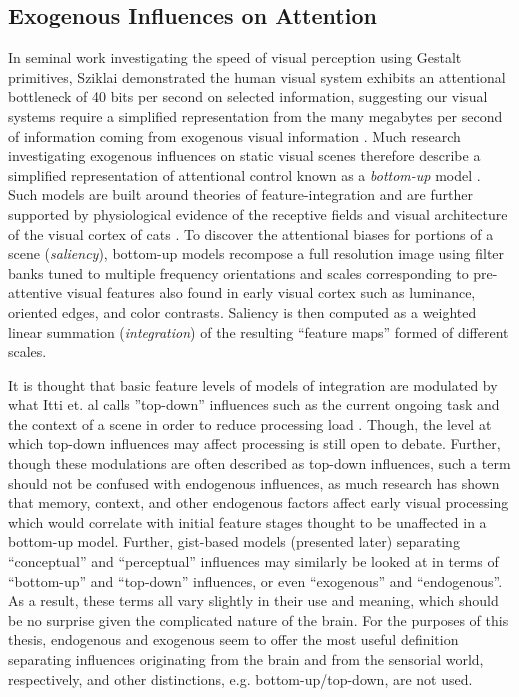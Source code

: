 \documentclass[a4paper,10pt,final]{ThesisStyle}
\begin{document}
\subsection{Exogenous Influences on Attention}

In seminal work investigating the speed of visual perception using Gestalt primitives, Sziklai demonstrated the human visual system exhibits an attentional bottleneck of 40 bits per second on selected information, suggesting our visual systems require a simplified representation from the many megabytes per second of information coming from exogenous visual information \cite{Sziklai1956,Merrill1968}.  Much research investigating exogenous influences on static visual scenes therefore describe a simplified representation of attentional control known as a \textit{bottom-up} model \cite{Koch1985,Itti1998,Wolfe1989,Itti2001}.  Such models are built around theories of feature-integration \cite{Treisman1980} and are further supported by physiological evidence of the receptive fields and visual architecture of the visual cortex of cats \cite{Hubel1962}.  To discover the attentional biases for portions of a scene (\textit{saliency}), bottom-up models recompose a full resolution image using filter banks tuned to multiple frequency orientations and scales corresponding to pre-attentive visual features also found in early visual cortex such as luminance, oriented edges, and color contrasts.  Saliency is then computed as a weighted linear summation (\textit{integration}) of the resulting ``feature maps'' formed of different scales. 

It is thought that basic feature levels of models of integration are modulated by what Itti et. al calls ''top-down'' influences \cite{Itti2001} such as the current ongoing task \cite{Yarbus1967,Smith2011a} and the context of a scene in order to reduce processing load \cite{Henderson2003,Torralba2006}.  Though, the level at which top-down influences may affect processing is still open to debate.  Further, though these modulations are often described as top-down influences, such a term should not be confused with endogenous influences, as much research has shown that memory, context, and other endogenous factors affect early visual processing \cite{Tatler2011} which would correlate with initial feature stages thought to be unaffected in a bottom-up model.  Further, gist-based models (presented later) separating ``conceptual'' and ``perceptual'' influences may similarly be looked at in terms of ``bottom-up'' and ``top-down'' influences, or even ``exogenous'' and ``endogenous''.  As a result, these terms all vary slightly in their use and meaning, which should be no surprise given the complicated nature of the brain.  For the purposes of this thesis, endogenous and exogenous seem to offer the most useful definition separating influences originating from the brain and from the sensorial world, respectively, and other distinctions, e.g. bottom-up/top-down, are not used. 
\end{document}
